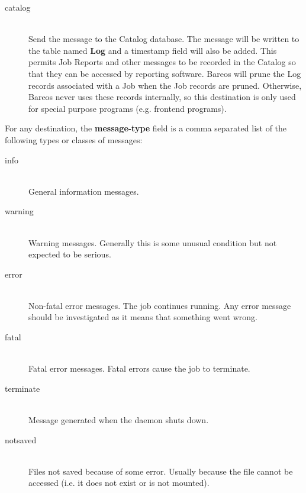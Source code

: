 \begin{description}
\begin{description}
\item [catalog] \hfill \\
Send the message to the Catalog database. The message will be
written to the table named {\bf Log} and a timestamp field will
also be added. This permits Job Reports and other messages to
be recorded in the Catalog so that they can be accessed by
reporting software.  Bareos will prune the Log records associated
with a Job when the Job records are pruned.  Otherwise, Bareos
never uses these records internally, so this destination is only
used for special purpose programs (e.g. frontend programs).

\end{description}

For any destination, the {\bf message-type} field is a comma separated
list of the following types or classes of messages:

\begin{description}

\item [info] \hfill \\
General information messages.

\item [warning] \hfill \\
Warning messages. Generally this is some  unusual condition but not expected
to be serious.

\item [error] \hfill \\
Non-fatal error messages. The job continues running.  Any error message should
be investigated as it means that something  went wrong.

\item [fatal] \hfill \\
Fatal error messages. Fatal errors cause the  job to terminate.

\item [terminate] \hfill \\
Message generated when the daemon shuts down.

\item [notsaved] \hfill \\
Files not saved because of some error.  Usually because the file cannot be
accessed (i.e. it does not  exist or is not mounted).


\end{description}
\end{description}
